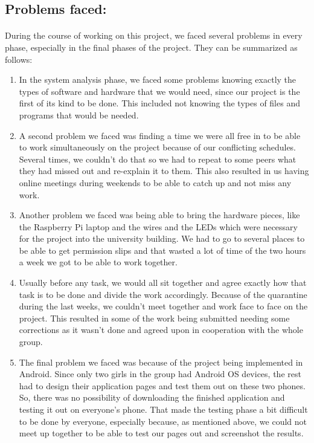 \documentclass[12pt, oneside, a4paper]{book}
\begin{document}
		\subsection{Problems faced:}
		\paragraph{}During the course of working on this project, we faced several problems in every phase, especially in the final phases of the project. They can be summarized as follows:
		\begin{enumerate}
			\item In the system analysis phase, we faced some problems knowing exactly the types of software and hardware that we would need, since our project is the first of its kind to be done. This included not knowing the types of files and programs that would be needed.
			\item A second problem we faced was finding a time we were all free in to be able to work simultaneously on the project because of our conflicting schedules. Several times, we couldn’t do that so we had to repeat to some peers what they had missed out and re-explain it to them. This also resulted in us having online meetings during weekends to be able to catch up and not miss any work.
			\item Another problem we faced was being able to bring the hardware pieces, like the Raspberry Pi laptop and the wires and the LEDs which were necessary for the project into the university building. We had to go to several places to be able to get permission slips and that wasted a lot of time of the two hours a week we got to be able to work together.
			\item Usually before any task, we would all sit together and agree exactly how that task is to be done and divide the work accordingly. Because of the quarantine during the last weeks, we couldn’t meet together and work face to face on the project. This resulted in some of the work being submitted needing some corrections as it wasn’t done and agreed upon in cooperation with the whole group.
			\item The final problem we faced was because of the project being implemented in Android. Since only two girls in the group had Android OS devices, the rest had to design their application pages and test them out on these two phones. So, there was no possibility of downloading the finished application and testing it out on everyone’s phone. That made the testing phase a bit difficult to be done by everyone, especially because, as mentioned above, we could not meet up together to be able to test our pages out and screenshot the results.
		\end{enumerate}
\end{document}
